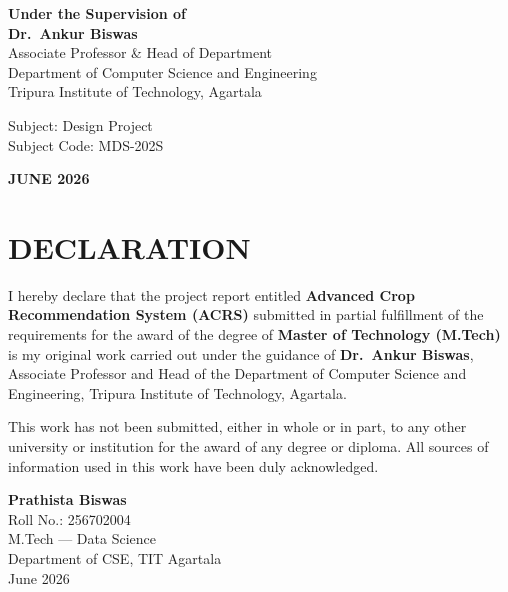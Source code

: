 \documentclass[12pt,a4paper,oneside]{report}
\begin{document}
\begin{titlepage}
{\textbf{Under the Supervision of}\\[3pt]
\textbf{Dr.\ Ankur Biswas}\\[3pt]
Associate Professor \& Head of Department\\[3pt]
Department of Computer Science and Engineering\\[3pt]
Tripura Institute of Technology, Agartala\par}
\vspace{0.35cm}
{\fontsize{12}{16}\selectfont
Subject: Design Project\\[3pt]
Subject Code: MDS-202S\par}
\vspace{0.35cm}
{\fontsize{12}{16}\selectfont\bfseries JUNE 2026\par}
\end{titlepage}

\chapter*{DECLARATION}
\begin{singlespacing}
I hereby declare that the project report entitled \textbf{Advanced Crop Recommendation System (ACRS)} submitted in partial fulfillment of the requirements for the award of the degree of \textbf{Master of Technology (M.Tech)} is my original work carried out under the guidance of \textbf{Dr.\ Ankur Biswas}, Associate Professor and Head of the Department of Computer Science and Engineering, Tripura Institute of Technology, Agartala.

\vspace{0.4cm}
This work has not been submitted, either in whole or in part, to any other university or institution for the award of any degree or diploma. All sources of information used in this work have been duly acknowledged.

\vspace{1.2cm}
\noindent\textbf{Prathista Biswas}\\
Roll No.: 256702004\\
M.Tech --- Data Science\\
Department of CSE, TIT Agartala\\
June 2026
\end{singlespacing}
\newpage

\end{document}
